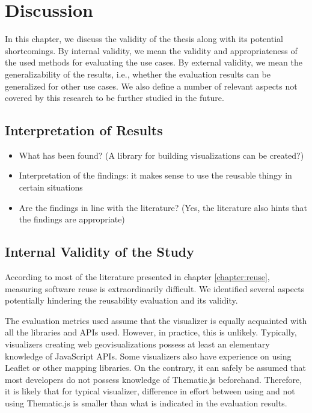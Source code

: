 
\chapter{Discussion}
\label{chapter:discussion}

In this chapter, we discuss the validity of the thesis along with its potential shortcomings. By internal validity, we mean the validity and appropriateness of the used methods for evaluating the use cases. By external validity, we mean the generalizability of the results, i.e., whether the evaluation results can be generalized for other use cases. We also define a number of relevant aspects not covered by this research to be further studied in the future.

\section{Interpretation of Results}

\begin{itemize}
	\item What has been found? (A library for building visualizations can be created?)
	\item Interpretation of the findings: it makes sense to use the reusable thingy in certain situations
	\item Are the findings in line with the literature? (Yes, the literature also hints that the findings are appropriate) 
\end{itemize}

\section{Internal Validity of the Study}

According to most of the literature presented in chapter \ref{chapter:reuse}, measuring software reuse is extraordinarily difficult. We identified several aspects potentially hindering the reusability evaluation and its validity.

The evaluation metrics used assume that the visualizer is equally acquainted with all the libraries and APIs used. However, in practice, this is unlikely. Typically, visualizers creating web geovisualizations possess at least an elementary knowledge of JavaScript APIs. Some visualizers also have experience on using Leaflet or other mapping libraries. On the contrary, it can safely be assumed that most developers do not possess knowledge of Thematic.js beforehand. Therefore, it is likely that for typical visualizer, difference in effort between using and not using Thematic.js is smaller than what is indicated in the evaluation results.

